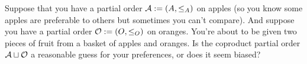 \documentclass[../main/CT4S-EN-RU]{subfiles}
\begin{document}
\begin{exampleRUS}
\end{exampleRUS}

\begin{exerciseENG}
Suppose that you have a partial order $\mathcal{A}:=(A,\leq_A)$ on apples (so you know some apples are preferable to others but sometimes you can't compare). And suppose you have a partial order $\mathcal{O}:=(O,\leq_O)$ on oranges. You're about to be given two pieces of fruit from a basket of apples and oranges. Is the coproduct partial order $\mathcal{A}\sqcup\mathcal{O}$ a reasonable guess for your preferences, or does it seem biased?
\end{exerciseENG}

\begin{exerciseRUS}
\end{exerciseRUS}
\end{document}
